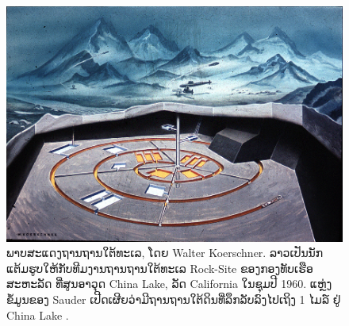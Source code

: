 \documentclass[10pt,twocolumn,letterpaper]{article}
\begin{document}
\begin{figure}[t]
\begin{center}
   \includegraphics[width=1\linewidth]{undersea.jpg}
\end{center}
   \caption{ພາບສະແດງຖານຖານໃຕ້ທະເລ, ໂດຍ Walter Koerschner. ລາວເປັນນັກແຕ້ມຮູບໃຫ້ກັບທີມງານຖານຖານໃຕ້ທະເລ Rock-Site ຂອງກອງທັບເຮືອສະຫະລັດ ທີ່ສູນອາວຸດ China Lake, ລັດ California ໃນຊຸມປີ 1960. ແຫຼ່ງຂໍ້ມູນຂອງ Sauder ເປີດເຜີຍວ່າມີຖານຖານໃຕ້ດິນທີ່ລຶກລັບລົງໄປເຖິງ 1 ໄມລ໌ ຢູ່ China Lake \cite{22,23}.}
\label{fig:5}
\label{fig:onecol}
\end{figure}
\end{document}
